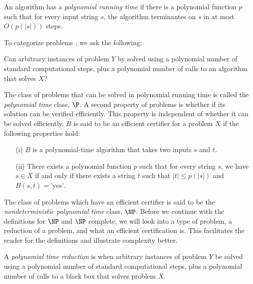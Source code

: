 
An algorithm has a \textit{polynomial running time} if there is a polynomial function $p$ such that for every input string $s$, the algorithm terminantes on $s$ in at most $O\left( p \left( \left\vert s \right\vert\right)\right)$ steps.  

To categorize problems \cite{kleinberg2006algorithm}, we ask the following:
\begin{prob}
Can arbitrary instances of problem $Y$ by solved using a polynomial number of standard computational steps, plus a polynomial number of calls to an algorithm that solves $X$?
\end{prob}
The class of problems that can be solved in polynomial running time is called the \textit{polynomial time} class, $\P$.  
A second property of problems is whether if its solution can be verified efficiently.  
This property is independent of whether it can be solved efficiently.  
$B$ is said to be an efficient certifier for a problem $X$  if the following properties hold:
\begin{itemize}
\item[(i)] $B$ is a polynomial-time algorithm that takes two inputs $s$ and $t$.
\item[(ii)] There exists a polynomial function $p$ such that for every string $s$, we have $s \in X$ if and only if there exists a string $t$ such that $\vert t \vert \leq p\left( \vert s \vert \right)$ and $B(s,t) = \text{'yes'}$.
\end{itemize}

The class of problems which have an efficient certifier is said to be the \textit{nondeterministic polynomial time} class, $\NP$. 
Before we continue with the definitions for $\NP$ and $\NP$ complete, we will look into a type of problem, a reduction of a problem, and what an efficient certification is.  
This facilitates the reader for the definitions and illustrate complexity better. 
 
A \textit{polynomial time reduction} is when arbitrary instances of problem $Y$ be solved using a polynomial number of standard computational steps, plus a polynomial number of calls to a black box that solves problem $X$.
